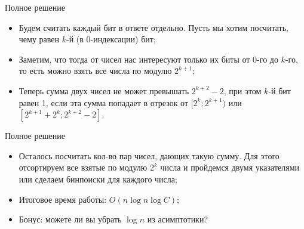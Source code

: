 \begin{frame}{Полное решение}
  \begin{itemize}
      \item Будем считать каждый бит в ответе отдельно. Пусть мы хотим посчитать, чему равен $k$-й (в 0-индексации) бит;
      \item Заметим, что тогда от чисел нас интересуют только их биты от $0$-го до $k$-го, то есть можно взять все числа по модулю $2^{k + 1}$;
      \item Теперь сумма двух чисел не может превышать $2^{k + 2} - 2$, при этом $k$-й бит равен 1, если эта сумма попадает в отрезок от $[2^k; 2^{k + 1})$ или $[2^{k + 1} + 2^k; 2^{k + 2} - 2]$.
  \end{itemize}
\end{frame}

\begin{frame}{Полное решение}
  \begin{itemize}
      \item Осталось посчитать кол-во пар чисел, дающих такую сумму. Для этого отсортируем все взятые по модулю $2^k$ числа и пройдемся двумя указателями или сделаем бинпоиски для каждого числа;
      \item Итоговое время работы: $O(n \log n \log C)$;
      \item Бонус: можете ли вы убрать $\log n$ из асимптотики?
  \end{itemize}
\end{frame}
